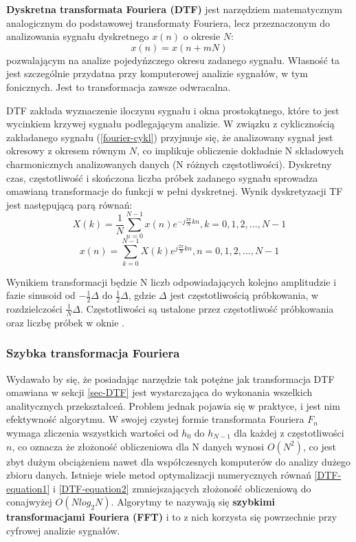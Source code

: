 \documentclass[12pt,a4paper,twoside]{mwart}
\begin{document}
\textbf{Dyskretna transformata Fouriera (DTF)} jest narzędziem matematycznym analogicznym do podstawowej transformaty Fouriera, lecz przeznaczonym do analizowania sygnału dyskretnego $x(n)$ o okresie $N$:
\begin{equation} \label{fourier-cykl}
  x(n) = x(n + mN)
\end{equation}
pozwalającym na analize pojedyńzczego okresu zadanego sygnału. Własność ta jest szczególnie przydatna przy komputerowej analizie sygnałów, w tym fonicznych. Jest to transformacja zawsze odwracalna. 

DTF zakłada wyznaczenie iloczynu sygnału i okna prostokątnego, które to jest wycinkiem krzywej sygnału podlegającym analizie. W związku z cyklicznością zakładanego sygnału (\ref{fourier-cykl}) przyjmuje się, że analizowany sygnał jest okresowy z okresem równym $N$, co implikuje obliczenie dokładnie N składowych charmonicznych analizowanych danych (N różnych częstotliwości). Dyskretny czas, częstotliwość i skończona liczba próbek zadanego sygnału sprowadza omawianą transformacje do funkcji w pełni dyskretnej. Wynik dyskretyzacji TF jest następującą parą równań:
\begin{equation} \label{DTF-equation1}
  X(k) = \frac{1}{N}\sum_{n = 0}^{N-1} x(n)e^{-j \frac{2 \pi} {N} kn},  k = 0, 1, 2,..., N-1
\end{equation}
\begin{equation} \label{DTF-equation2}
  x(n) = \sum_{k = 0}^{N-1} X(k)e^{j \frac{2 \pi} {N} kn}, n = 0, 1,  2,...,N-1
\end{equation}

Wynikiem transformacji będzie N liczb odpowiadających kolejno amplitudzie i fazie sinusoid od $- \frac{1}{2} \Delta $ do $\frac{1}{2} \Delta $, gdzie $\Delta$ jest częstotliwością próbkowania, w rozdzielczości $\frac{1}{N} \Delta$. Częstotliwości są ustalone przez częstotliwość próbkowania oraz liczbę próbek w oknie \cite[198 - 200, 204-206]{CyfrowePrzetwarzanieSygnalowOdTeoriiDoZastosowan}.

\subsubsection{Szybka transformacja Fouriera} \label{sec-FFT}
Wydawało by się, że posiadając narzędzie tak potężne jak transformacja DTF omawiana w sekcji \ref{sec-DTF} jest wystarczająca do wykonania wszelkich analitycznych przekształceń. Problem jednak pojawia się w praktyce, i jest nim efektywność algorytmu. W swojej czystej formie transformata Fouriera $F_n$ wymaga zliczenia wszystkich wartości od $h_0$ do $h_{N-1}$ dla każdej z częstotliwości $n$, co oznacza że złożoność obliczeniowa dla N danych wynosi $O(N^2)$, co jest zbyt dużym obciążeniem nawet dla współczesnych komputerów do analizy dużego zbioru danych. Istnieje wiele metod optymalizacji numerycznych równań \ref{DTF-equation1} i \ref{DTF-equation2} zmniejszających złożoność obliczeniową do conajwyżej $O(N log_2 N)$. Algorytmy te nazywają się \textbf{szybkimi transformacjami Fouriera (FFT)} i to z nich korzysta się powrzechnie przy cyfrowej analizie sygnałów.
\end{document}

